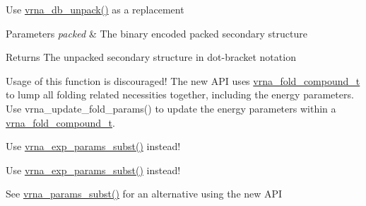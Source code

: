 \begin{DoxyRefList}
\item[\label{deprecated__deprecated000131}%
\hypertarget{deprecated__deprecated000131}{}%
Global \hyperlink{group__struct__utils_ga071c6921efe1eb974f115ee6fefa3c39}{unpack\+\_\+structure} (const char $\ast$packed)]Use \hyperlink{group__struct__utils_ga6490adff857d84ce06e6f379ae3a4512}{vrna\+\_\+db\+\_\+unpack()} as a replacement 
\begin{DoxyParams}{Parameters}
{\em packed} & The binary encoded packed secondary structure \\
\hline
\end{DoxyParams}
\begin{DoxyReturn}{Returns}
The unpacked secondary structure in dot-\/bracket notation  
\end{DoxyReturn}

\item[\label{deprecated__deprecated000025}%
\hypertarget{deprecated__deprecated000025}{}%
Global \hyperlink{group__consensus__fold_gac484c6bd429bafbd353b91044508d8e9}{update\+\_\+alifold\+\_\+params} (void)]Usage of this function is discouraged! The new A\+P\+I uses \hyperlink{group__fold__compound_ga1b0cef17fd40466cef5968eaeeff6166}{vrna\+\_\+fold\+\_\+compound\+\_\+t} to lump all folding related necessities together, including the energy parameters. Use vrna\+\_\+update\+\_\+fold\+\_\+params() to update the energy parameters within a \hyperlink{group__fold__compound_ga1b0cef17fd40466cef5968eaeeff6166}{vrna\+\_\+fold\+\_\+compound\+\_\+t}.  
\item[\label{deprecated__deprecated000117}%
\hypertarget{deprecated__deprecated000117}{}%
Global \hyperlink{part__func__co_8h_a6e0f36c1f9b7d9dd4bfbad914c1119e5}{update\+\_\+co\+\_\+pf\+\_\+params} (int length)]Use \hyperlink{group__energy__parameters_ga8e7ac4fab3b0cc03afbc134eaafb3525}{vrna\+\_\+exp\+\_\+params\+\_\+subst()} instead! 
\item[\label{deprecated__deprecated000118}%
\hypertarget{deprecated__deprecated000118}{}%
Global \hyperlink{part__func__co_8h_a75465d7e8793db68a434d83df9a2e794}{update\+\_\+co\+\_\+pf\+\_\+params\+\_\+par} (int length, vrna\+\_\+exp\+\_\+param\+\_\+t $\ast$parameters)]Use \hyperlink{group__energy__parameters_ga8e7ac4fab3b0cc03afbc134eaafb3525}{vrna\+\_\+exp\+\_\+params\+\_\+subst()} instead! 
\item[\label{deprecated__deprecated000033}%
\hypertarget{deprecated__deprecated000033}{}%
Global \hyperlink{group__mfe__cofold_ga4fcbf34e77b99bfbb2333d2ab0c41a57}{update\+\_\+cofold\+\_\+params} (void)]See \hyperlink{group__energy__parameters_ga5d1909208f7ea3baa98b75afaa1f62ca}{vrna\+\_\+params\+\_\+subst()} for an alternative using the new A\+P\+I  

\end{DoxyRefList}
